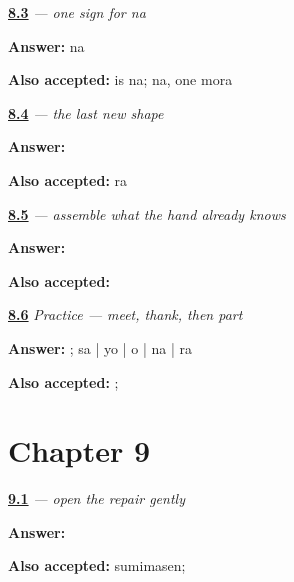 \noindent\begin{minipage}[t]{\linewidth}
\raggedright
\hyperlink{review-JA-W08-na-read}{\textbf{8.3}} \emph{ — one sign for \emph{na}}\par
\small \textbf{Answer:} na\par
\footnotesize \textbf{Also accepted:}  is na; na, one mora
\end{minipage}\par\medskip

\noindent\begin{minipage}[t]{\linewidth}
\raggedright
\hyperlink{review-JA-W08-ra-write}{\textbf{8.4}} \emph{ — the last new shape}\par
\small \textbf{Answer:} \par
\footnotesize \textbf{Also accepted:}  ra
\end{minipage}\par\medskip

\noindent\begin{minipage}[t]{\linewidth}
\raggedright
\hyperlink{review-JA-W08-sayounara-read-build}{\textbf{8.5}} \emph{ — assemble what the hand already knows}\par
\small \textbf{Answer:} \par
\footnotesize \textbf{Also accepted:} 
\end{minipage}\par\medskip

\noindent\begin{minipage}[t]{\linewidth}
\raggedright
\hyperlink{review-JA-C08-sayounara-four-skills}{\textbf{8.6}} \emph{Practice — meet, thank, then part}\par
\small \textbf{Answer:} ; sa | yo | o | na | ra\par
\footnotesize \textbf{Also accepted:} ; 
\end{minipage}\par\medskip

\section*{Chapter 9}

\noindent\begin{minipage}[t]{\linewidth}
\raggedright
\hyperlink{review-JA-C09-sumimasen-job}{\textbf{9.1}} \emph{ — open the repair gently}\par
\small \textbf{Answer:} \par
\footnotesize \textbf{Also accepted:} sumimasen; 
\end{minipage}\par\medskip

